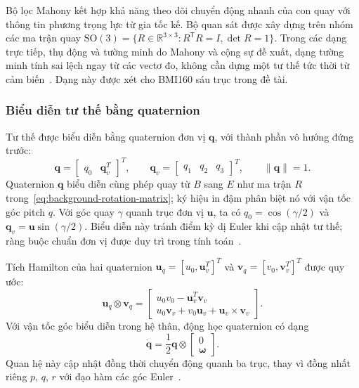 Bộ lọc Mahony kết hợp khả năng theo dõi chuyển động nhanh của con quay với thông tin phương trọng lực từ gia tốc kế. Bộ quan sát được xây dựng trên nhóm các ma trận quay $\mathrm{SO}(3)=\{R\in\mathbb{R}^{3\times3}:R^{\mathsf T}R=I,\det R=1\}$. Trong các dạng trực tiếp, thụ động và tường minh do Mahony và cộng sự đề xuất, dạng tường minh tính sai lệch ngay từ các vectơ đo, không cần dựng một tư thế tức thời từ cảm biến~\cite{mahony2008nonlinear}. Dạng này được xét cho BMI160 sáu trục trong đề tài.

\subsubsection{Biểu diễn tư thế bằng quaternion}

Tư thế được biểu diễn bằng quaternion đơn vị $\mathbf q$, với thành phần vô hướng đứng trước:
\begin{equation}
    \mathbf q=\begin{bmatrix}q_0&\mathbf q_v^T\end{bmatrix}^T,
    \qquad
    \mathbf q_v=\begin{bmatrix}q_1&q_2&q_3\end{bmatrix}^T,
    \qquad \|\mathbf q\|=1.
    \label{eq:background-quaternion}
\end{equation}
Quaternion $\mathbf q$ biểu diễn cùng phép quay từ $B$ sang $E$ như ma trận $R$ trong~\eqref{eq:background-rotation-matrix}; ký hiệu in đậm phân biệt nó với vận tốc góc pitch $q$. Với góc quay $\gamma$ quanh trục đơn vị $\mathbf u$, ta có $q_0=\cos(\gamma/2)$ và $\mathbf q_v=\mathbf u\sin(\gamma/2)$. Biểu diễn này tránh điểm kỳ dị Euler khi cập nhật tư thế; ràng buộc chuẩn đơn vị được duy trì trong tính toán~\cite{vectornavAttitudeRepresentations}.

Tích Hamilton của hai quaternion $\mathbf u_q=[u_0,\mathbf u_v^T]^T$ và $\mathbf v_q=[v_0,\mathbf v_v^T]^T$ được quy ước:
\begin{equation}
    \mathbf u_q\otimes\mathbf v_q=
    \begin{bmatrix}
        u_0v_0-\mathbf u_v^T\mathbf v_v\\
        u_0\mathbf v_v+v_0\mathbf u_v+\mathbf u_v\times\mathbf v_v
    \end{bmatrix}.
    \label{eq:background-hamilton-product}
\end{equation}
Với vận tốc góc biểu diễn trong hệ thân, động học quaternion có dạng
\begin{equation}
    \dot{\mathbf q}=\frac12\mathbf q\otimes
        \begin{bmatrix}0\\\symbf\omega\end{bmatrix}.
    \label{eq:background-quaternion-kinematics}
\end{equation}
Quan hệ này cập nhật đồng thời chuyển động quanh ba trục, thay vì đồng nhất riêng $p$, $q$, $r$ với đạo hàm các góc Euler~\cite{mahony2008nonlinear}.

